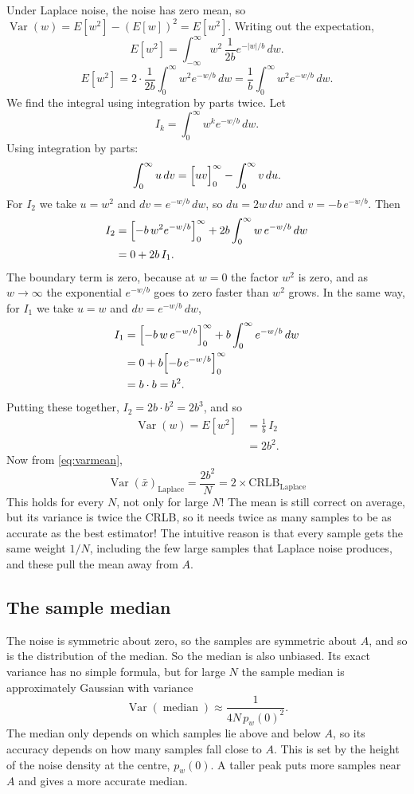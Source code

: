 \documentclass[11pt]{article}
\numberwithin{figure}{section}
\numberwithin{equation}{section}
\begin{document}
Under Laplace noise, the noise has zero mean, so $\operatorname{Var}(w) = E[w^2] - (E[w])^2
= E[w^2]$. Writing out the expectation,
\[
  E[w^2] = \int_{-\infty}^{\infty} w^2 \, \frac{1}{2b} e^{-|w|/b} \, dw .
\]
\[
  E[w^2] = 2 \cdot \frac{1}{2b}\int_{0}^{\infty} w^2 e^{-w/b} \, dw
  = \frac{1}{b}\int_{0}^{\infty} w^2 e^{-w/b} \, dw .
\]
We find the integral using integration by parts twice. Let
\[
  I_k = \int_{0}^{\infty} w^k e^{-w/b} \, dw .
\]
Using integration by parts: 
\[
  \int_0^\infty u \, dv = \Bigl[uv\Bigr]_0^\infty - \int_0^\infty v \, du .
\]
For $I_2$ we take $u = w^2$ and $dv = e^{-w/b}\,dw$, so $du = 2w\,dw$ and $v = -b\,e^{-w/b}$.
Then
\begin{align*}
  I_2 &= \Bigl[-b\,w^2 e^{-w/b}\Bigr]_0^\infty + 2b\int_0^\infty w\, e^{-w/b}\,dw \\
      &= 0 + 2b\, I_1 .
\end{align*}
The boundary term is zero, because at $w = 0$ the factor $w^2$ is zero, and as $w \to \infty$ the exponential $e^{-w/b}$ goes to zero faster than $w^2$ grows. In the same way, for $I_1$ we
take $u = w$ and $dv = e^{-w/b}\,dw$,
\begin{align*}
  I_1 &= \Bigl[-b\,w\, e^{-w/b}\Bigr]_0^\infty + b\int_0^\infty e^{-w/b}\,dw \\
      &= 0 + b\Bigl[-b\, e^{-w/b}\Bigr]_0^\infty \\
      &= b \cdot b = b^2 .
\end{align*}
Putting these together, $I_2 = 2b \cdot b^2 = 2b^3$, and so
\begin{align*}
  \operatorname{Var}(w) = E[w^2] &= \frac{1}{b}\, I_2 \\
  &= 2b^2 .
\end{align*}
Now from \eqref{eq:varmean},
\[
  \boxed{\operatorname{Var}(\bar x)_{\text{Laplace}} = \frac{2b^2}{N} = 2 \times \text{CRLB}_{\text{Laplace}}}
\]
This holds for every $N$, not only for large $N$! The mean is still correct on average, but its variance is twice the CRLB, so it needs twice as many samples to be as accurate as the best estimator! The intuitive reason is that every sample gets the same weight $1/N$, including the few large samples that Laplace noise produces, and these pull the mean away from $A$.

\subsection{The sample median}
\label{sec:median}

The noise is symmetric about zero, so the samples are symmetric about $A$, and so is the distribution of the median. So the median is also unbiased. Its exact variance has no simple formula, but for large $N$ the sample median is approximately Gaussian with
variance~\cite[Ch.~21]{vdv}
\begin{equation}
  \operatorname{Var}(\operatorname{median}) \approx \frac{1}{4N\, p_w(0)^2}.
  \label{eq:varmedian}
\end{equation}
The median only depends on which samples lie above and below $A$, so its accuracy depends on
how many samples fall close to $A$. This is set by the height of the noise density at the centre,
$p_w(0)$. A taller peak puts more samples near $A$ and gives a more accurate median.
\end{document}
